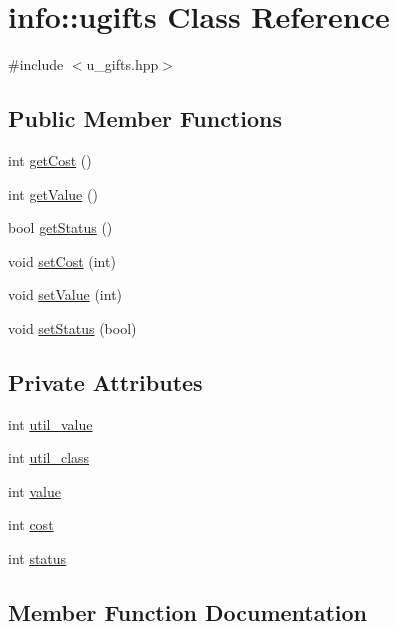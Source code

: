 \hypertarget{classinfo_1_1ugifts}{}\section{info\+:\+:ugifts Class Reference}
\label{classinfo_1_1ugifts}


{\ttfamily \#include $<$u\+\_\+gifts.\+hpp$>$}

\subsection*{Public Member Functions}
\begin{DoxyCompactItemize}
\item 
int \hyperlink{classinfo_1_1ugifts_abc1e76e3cffe92378e2409cb920e4cfe}{get\+Cost} ()
\item 
int \hyperlink{classinfo_1_1ugifts_ad9e27c3598db2e3497d398e5816b54a6}{get\+Value} ()
\item 
bool \hyperlink{classinfo_1_1ugifts_a0543d315e5e06b63577841de5669323e}{get\+Status} ()
\item 
void \hyperlink{classinfo_1_1ugifts_adac6549a1290e2c37f9cb772e26b5559}{set\+Cost} (int)
\item 
void \hyperlink{classinfo_1_1ugifts_a8d7ff6871e8d6ec14d1df0a9df006f26}{set\+Value} (int)
\item 
void \hyperlink{classinfo_1_1ugifts_ad656167fd2d6ce7b2fa82199fefa8826}{set\+Status} (bool)
\end{DoxyCompactItemize}
\subsection*{Private Attributes}
\begin{DoxyCompactItemize}
\item 
int \hyperlink{classinfo_1_1ugifts_ace26fb8f859ca33f4f0640f9ae3e334e}{util\+\_\+value}
\item 
int \hyperlink{classinfo_1_1ugifts_aecd6e74f6918f05159553cbc681b9755}{util\+\_\+class}
\item 
int \hyperlink{classinfo_1_1ugifts_acb5eadf80c47a571fea87099f62c427b}{value}
\item 
int \hyperlink{classinfo_1_1ugifts_ab24c8494fd6bda96bc675291cc00af2a}{cost}
\item 
int \hyperlink{classinfo_1_1ugifts_ab873e82223a756d907ff43441be17b1a}{status}
\end{DoxyCompactItemize}


\subsection{Member Function Documentation}
\mbox{\label{classinfo_1_1ugifts_abc1e76e3cffe92378e2409cb920e4cfe}} 
